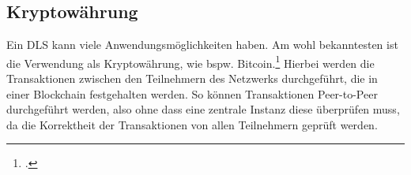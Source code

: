 \subsection{Kryptowährung}
\label{sec:definition-kryptowaehrung}
Ein DLS kann viele Anwendungsmöglichkeiten haben. Am wohl bekanntesten ist die Verwendung als Kryptowährung, wie bspw. Bitcoin.\footcite[Vgl. hierzu und zum Folgenden][1]{q4} 
Hierbei werden die Transaktionen zwischen den Teilnehmern des Netzwerks durchgeführt, die in einer Blockchain festgehalten werden. 
So können Transaktionen Peer-to-Peer durchgeführt werden, also ohne dass eine zentrale Instanz diese überprüfen muss, da die Korrektheit der Transaktionen von allen Teilnehmern geprüft werden.